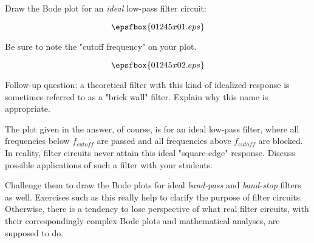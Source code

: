 

Draw the Bode plot for an {\it ideal} low-pass filter circuit:

$$\epsfbox{01245x01.eps}$$

Be sure to note the "cutoff frequency" on your plot.







$$\epsfbox{01245x02.eps}$$

\vskip 10pt

Follow-up question: a theoretical filter with this kind of idealized response is sometimes referred to as a "brick wall" filter.  Explain why this name is appropriate.







The plot given in the answer, of course, is for an ideal low-pass filter, where all frequencies below $f_{cutoff}$ are passed and all frequencies above $f_{cutoff}$ are blocked.  In reality, filter circuits never attain this ideal "square-edge" response.  Discuss possible applications of such a filter with your students.

Challenge them to draw the Bode plots for ideal {\it band-pass} and {\it band-stop} filters as well.  Exercises such as this really help to clarify the purpose of filter circuits.  Otherwise, there is a tendency to lose perspective of what real filter circuits, with their correspondingly complex Bode plots and mathematical analyses, are supposed to do.




